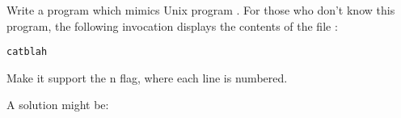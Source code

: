 \begin{Exercise}[title={Cat},difficulty=6]
\label{ex:cat}
\Question \label{ex:cat q1} Write a program which mimics Unix program
. For those who don't know this program, the following 
invocation displays the contents of the file :
\begin{alltt}
\pr cat blah
\end{alltt}

\Question Make it support the \-n flag, where each line is
numbered.

\end{Exercise}

\begin{Answer}

\Question A solution might be:


\end{Answer}
